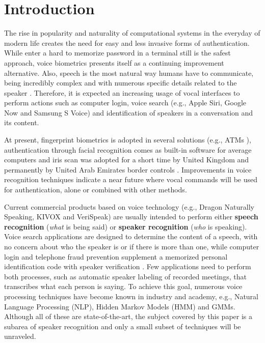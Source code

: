 \chapter{Introduction}

The rise in popularity and naturality of computational systems in the everyday of modern life creates the need for easy and less invasive forms of authentication. While enter a hard to memorize password in a terminal still is the safest approach, voice biometrics presents itself as a continuing improvement alternative. Also, speech is the most natural way humans have to communicate, being incredibly complex and with numerous specific details related to the speaker \cite{bimbot.et.al.2004}. Therefore, it is expected an increasing usage of vocal interfaces to perform actions such as computer login, voice search (e.g., Apple Siri, Google Now and Samsung S Voice) and identification of speakers in a conversation and its content.

At present, fingerprint biometrics is adopted in several solutions (e.g., ATMs \cite{wang.wu.2002}), authentication through facial recognition comes as built-in software for average computers and iris scan was adopted for a short time by United Kingdom and permanently by United Arab Emirates border controls \cite{sasse.2007, raisi.khouri.2008}. Improvements in voice recognition techniques indicate a near future where vocal commands will be used for authentication, alone or combined with other methods.

Current commercial products based on voice technology (e.g., Dragon Naturally Speaking, KIVOX and VeriSpeak) are usually intended to perform either \textbf{speech recognition} (\emph{what} is being said) or \textbf{speaker recognition} (\emph{who} is speaking). Voice search applications are designed to determine the content of a speech, with no concern about who the speaker is or if there is more than one, while computer login and telephone fraud prevention supplement a memorized personal identification code with speaker verification \cite{reynolds.1995}. Few applications need to perform both processes, such as automatic speaker labeling of recorded meetings, that transcribes what each person is saying. To achieve this goal, numerous voice processing techniques have become known in industry and academy, e.g., Natural Language Processing (NLP), Hidden Markov Models (HMM) and GMMs. Although all of these are state-of-the-art, the subject covered by this paper is a subarea of speaker recognition and only a small subset of techniques will be unraveled.

